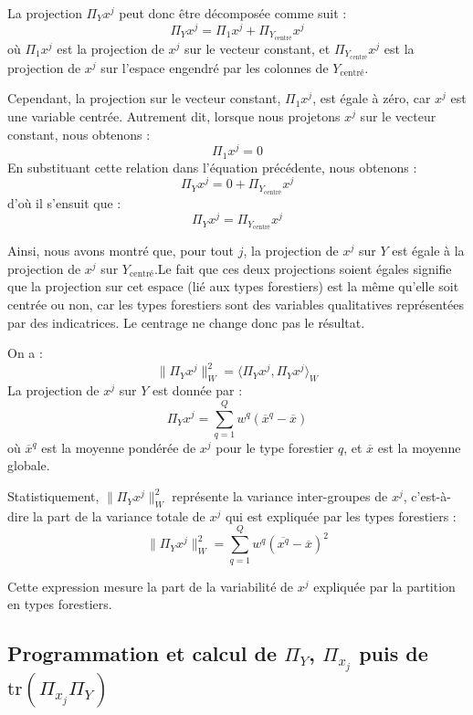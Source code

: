 \documentclass[
]{article}
\begin{document}
La projection \(\Pi_Y x^j\) peut donc être décomposée comme suit : \[
\Pi_Y x^j = \Pi_1 x^j + \Pi_{Y_{\text{centré}}} x^j
\] où \(\Pi_1 x^j\) est la projection de \(x^j\) sur le vecteur
constant, et \(\Pi_{Y_{\text{centré}}} x^j\) est la projection de
\(x^j\) sur l'espace engendré par les colonnes de \(Y_{\text{centré}}\).

Cependant, la projection sur le vecteur constant, \(\Pi_1 x^j\), est
égale à zéro, car \(x^j\) est une variable centrée. Autrement dit,
lorsque nous projetons \(x^j\) sur le vecteur constant, nous obtenons :
\[
\Pi_1 x^j = 0
\] En substituant cette relation dans l'équation précédente, nous
obtenons : \[
\Pi_Y x^j = 0 + \Pi_{Y_{\text{centré}}} x^j
\] d'où il s'ensuit que : \[
\Pi_Y x^j = \Pi_{Y_{\text{centré}}} x^j
\]

Ainsi, nous avons montré que, pour tout \(j\), la projection de \(x^j\)
sur \(Y\) est égale à la projection de \(x^j\) sur
\(Y_{\text{centré}}\).\newline Le fait que ces deux projections soient
égales signifie que la projection sur cet espace (lié aux types
forestiers) est la même qu'elle soit centrée ou non, car les types
forestiers sont des variables qualitatives représentées par des
indicatrices. Le centrage ne change donc pas le résultat.

On a : \[
\| \Pi_Y x^j \|_W^2 = \langle \Pi_Y x^j, \Pi_Y x^j \rangle_W
\] La projection de \(x^j\) sur \(Y\) est donnée par : \[
\Pi_Y x^j = \sum_{q=1}^{Q} w^q (\overline{x}^q - \overline{x})
\] où \(\overline{x}^q\) est la moyenne pondérée de \(x^j\) pour le type
forestier \(q\), et \(\overline{x}\) est la moyenne globale.

Statistiquement, \(\| \Pi_Y x^j \|_W^2\) représente la variance
inter-groupes de \(x^j\), c'est-à-dire la part de la variance totale de
\(x^j\) qui est expliquée par les types forestiers : \[
\| \Pi_Y x^j \|_W^2 = \sum_{q=1}^{Q} w^q (\overline{x^q} - \overline{x})^2
\]

Cette expression mesure la part de la variabilité de \(x^j\) expliquée
par la partition en types forestiers.

\hypertarget{programmation-et-calcul-de-pi_y-pi_x_j-puis-de-texttrpi_x_j-pi_y}{%
\subsection{\texorpdfstring{Programmation et calcul de \(\Pi_Y\),
\(\Pi_{x_j}\) puis de
\(\text{tr}(\Pi_{x_j} \Pi_Y)\)}{Programmation et calcul de \textbackslash Pi\_Y, \textbackslash Pi\_\{x\_j\} puis de \textbackslash text\{tr\}(\textbackslash Pi\_\{x\_j\} \textbackslash Pi\_Y)}}\label{programmation-et-calcul-de-pi_y-pi_x_j-puis-de-texttrpi_x_j-pi_y}}
\end{document}
